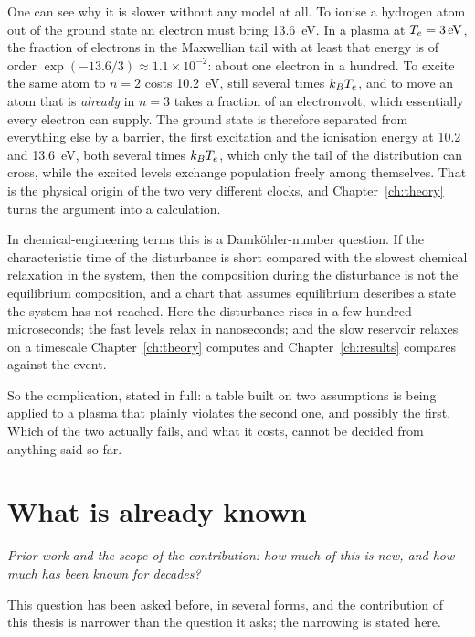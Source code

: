 One can see why it is slower without any model at all. To ionise a hydrogen atom
out of the ground state an electron must bring \SI{13.6}{\electronvolt}. In a
plasma at $T_e = \SI{3}{\electronvolt}$, the fraction of electrons in the
Maxwellian tail with at least that energy is of order
$\exp(-13.6/3) \approx 1.1\times10^{-2}$: about one electron in a hundred. To
excite the same atom to $n=2$ costs \SI{10.2}{\electronvolt}, still several times
$k_BT_e$, and to move an
atom that is \emph{already} in $n=3$ takes a fraction of an electronvolt, which
essentially every electron can supply. The ground state is therefore separated
from everything else by a barrier, the first excitation and the ionisation
energy at \num{10.2} and \SI{13.6}{\electronvolt}, both several times $k_BT_e$,
which only the tail of the distribution can cross, while the excited levels exchange population freely among themselves. That
is the physical origin of the two very different clocks, and
Chapter~\ref{ch:theory} turns the argument into a calculation.

In chemical-engineering terms this is a Damk\"ohler-number question. If the characteristic time of the disturbance is
short compared with the slowest chemical relaxation in the system, then the
composition during the disturbance is not the equilibrium composition, and a
chart that assumes equilibrium describes a state the system has not reached. Here
the disturbance rises in a few hundred microseconds; the fast levels relax in nanoseconds; and the
slow reservoir relaxes on a timescale Chapter~\ref{ch:theory} computes and
Chapter~\ref{ch:results} compares against the event.

So the complication, stated in full: a table built on two assumptions is being
applied to a plasma that plainly violates the second one, and possibly the first.
Which of the two actually fails, and what it costs, cannot be decided from anything
said so far.

\section{What is already known}
\label{sec:prior_work}

\emph{Prior work and the scope of the contribution: how much of this is new, and how much has been known for
decades?}

This question has been asked before, in several forms, and the contribution of
this thesis is narrower than the question it asks; the narrowing is stated here.

